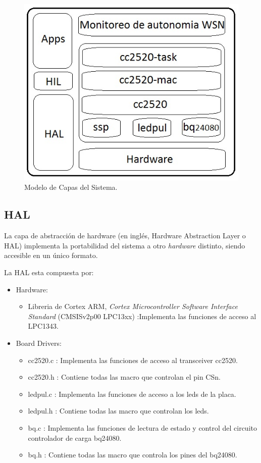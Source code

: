 {\begin{figure}[h!]
	\centering
    \includegraphics[width=.5\textwidth]{./Figures/arq.png}
    	\caption{Modelo de Capas del Sistema.}
	\label{fig:capas}
\end{figure}


\subsection{HAL}
\label{subsec:hal} 

La capa de abstracción de hardware (en inglés, Hardware Abstraction Layer o HAL) implementa la portabilidad del sistema a otro \textit{hardware} distinto, siendo accesible en un único formato.

\noindent La HAL esta compuesta por:
\begin{itemize}
\item Hardware:
	\begin{itemize}
	\item Libreria de Cortex ARM, \textit{Cortex Microcontroller Software Interface Standard} \citep{arm} (CMSISv2p00 LPC13xx) :Implementa las funciones de acceso al LPC1343.	
	\end{itemize}
\item Board Drivers:
	\begin{itemize}
	\item cc2520.c : Implementa las funciones de acceso al transceiver cc2520.
	\item cc2520.h : Contiene todas las macro que controlan el pin CSn.
	\item ledpul.c : Implementa las funciones de acceso a los leds de la placa.
	\item ledpul.h : Contiene todas las macro que controlan los leds.
	\item bq.c : Implementa las funciones de lectura de estado y control del circuito controlador de carga bq24080.
	\item bq.h : Contiene todas las macro que controla los pines del bq24080.
	\end{itemize}
\end{itemize}
		
}
